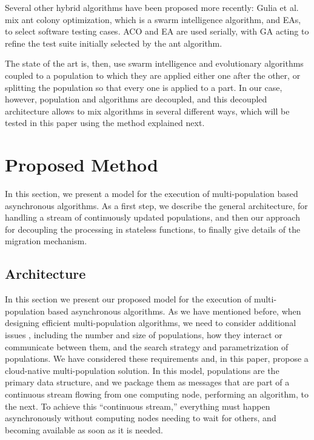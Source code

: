 \documentclass[runningheads]{llncs}
\begin{document}
Several other hybrid algorithms have been proposed more recently:
Gulia et al. \cite{gulia2019hybrid} mix ant colony optimization,
which is a swarm intelligence algorithm, and EAs, to select
software testing cases. ACO and EA are used serially, with GA acting
to refine the test suite initially selected by the ant algorithm.

The state of the art is, then, use swarm intelligence and evolutionary
algorithms coupled to a population to which they are applied either
one after the other, or splitting the population so that every one is
applied to a part. In our case, however, population and algorithms are
decoupled, and this decoupled architecture allows to mix algorithms in
several different ways, which will be tested in this paper using the
method explained next.


\section{Proposed Method}
\label{method}

In this section, we present a model for the execution of multi-population based
asynchronous algorithms. As a first step, we describe the general architecture,
for handling a stream of continuously updated populations,  and then our
approach for decoupling the processing in stateless functions, to finally give
details of the migration mechanism.


\subsection{Architecture}
\label{arch}

In this section we present our proposed model for the execution of
multi-population based asynchronous algorithms. As we have mentioned before, when
designing efficient multi-population algorithms, we need to consider additional
issues \cite{Ma2019}, including the number and size of populations, how they
interact or communicate between them, and the search strategy and parametrization of
populations. We have considered these requirements and, in this paper,
propose a cloud-native
multi-population solution. In this model, populations are the primary data
structure, and we package them as messages that are part of a continuous stream flowing
from one computing node, performing an algorithm, to the next. To achieve this ``continuous stream,''
everything must happen asynchronously without computing nodes needing to wait for
others, and becoming available as soon as it is needed.
\end{document}
